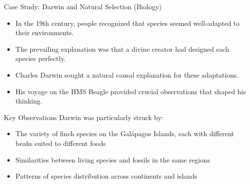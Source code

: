 \documentclass{beamer}
\begin{document}
\begin{frame}{Case Study: Darwin and Natural Selection (Biology)}
    \begin{itemize}
        \item In the 19th century, people recognized that species seemed well-adapted to their environments.
        \item The prevailing explanation was that a divine creator had designed each species perfectly.
        \item Charles Darwin sought a natural causal explanation for these adaptations.
        \item His voyage on the HMS Beagle provided crucial observations that shaped his thinking.
    \end{itemize}
    
    \begin{block}{Key Observations}
        Darwin was particularly struck by:
        \begin{itemize}
            \item The variety of finch species on the Galápagos Islands, each with different beaks suited to different foods
            \item Similarities between living species and fossils in the same regions
            \item Patterns of species distribution across continents and islands
        \end{itemize}
    \end{block}
\end{frame}
\end{document}
